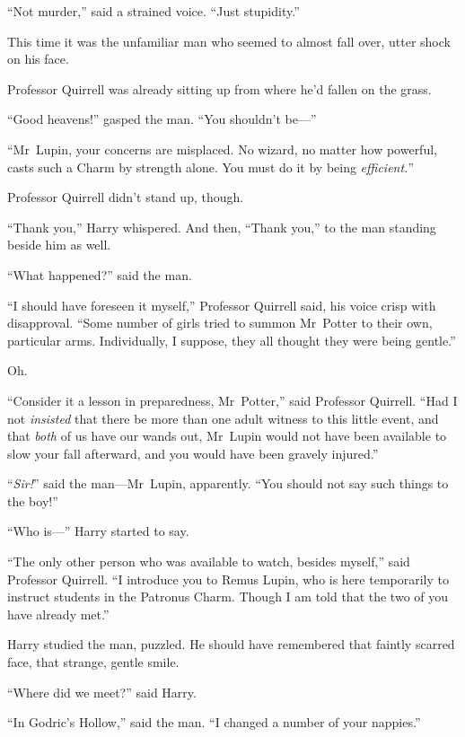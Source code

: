 “Not murder,” said a strained voice. “Just stupidity.”

This time it was the unfamiliar man who seemed to almost fall over, utter shock
on his face.

Professor Quirrell was already sitting up from where he’d fallen on the grass.

“Good heavens!” gasped the man. “You shouldn’t be—”

“Mr~Lupin, your concerns are misplaced. No wizard, no matter how powerful,
casts such a Charm by strength alone. You must do it by being \emph{efficient.}”

Professor Quirrell didn’t stand up, though.

“Thank you,” Harry whispered. And then, “Thank you,” to the man standing beside
him as well.

“What happened?” said the man.

“I should have foreseen it myself,” Professor Quirrell said, his voice crisp
with disapproval. “Some number of girls tried to summon Mr~Potter to their
own, particular arms. Individually, I suppose, they all thought they were being
gentle.”

Oh.

“Consider it a lesson in preparedness, Mr~Potter,” said Professor Quirrell.
“Had I not \emph{insisted} that there be more than one adult witness to this
little event, and that \emph{both} of us have our wands out, Mr~Lupin would
not have been available to slow your fall afterward, and you would have been
gravely injured.”

“\emph{Sir!}” said the man—Mr~Lupin, apparently. “You should not say such
things to the boy!”

“Who is—” Harry started to say.

“The only other person who was available to watch, besides myself,” said
Professor Quirrell. “I introduce you to Remus Lupin, who is here temporarily to
instruct students in the Patronus Charm. Though I am told that the two of you
have already met.”

Harry studied the man, puzzled. He should have remembered that faintly scarred
face, that strange, gentle smile.

“Where did we meet?” said Harry.

“In Godric’s Hollow,” said the man. “I changed a number of your nappies.”

\later

